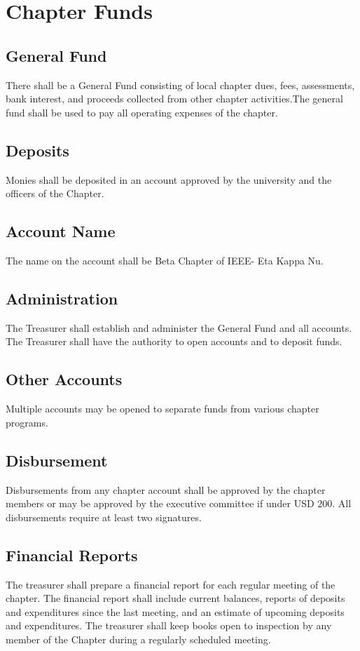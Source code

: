 \documentclass[10pt, oneside]{article}
\begin{document}
\section{Chapter Funds}
\subsection{General Fund}
There shall be a General Fund consisting of local chapter dues, fees, assessments, bank interest, and proceeds collected from other chapter activities.The general fund shall be used to pay all operating expenses of the chapter.
\subsection{Deposits}
Monies shall be deposited in an account approved by the university and the officers of the Chapter.
\subsection{Account Name}
The name on the account shall be Beta Chapter of IEEE- Eta Kappa Nu.
\subsection{Administration}
The Treasurer shall establish and administer the General Fund and all accounts. The Treasurer shall have the authority to open accounts and to deposit funds.
\subsection{Other Accounts}
Multiple accounts may be opened to separate funds from various chapter programs.
\subsection{Disbursement}
Disbursements from any chapter account shall be approved by the chapter members or may be approved by the executive committee if under USD 200. All disbursements require at least two signatures.
\subsection{Financial Reports}
The treasurer shall prepare a financial report for each regular meeting of the chapter. The financial report shall include current balances, reports of deposits and expenditures since the last meeting, and an estimate of upcoming deposits and expenditures. The treasurer shall keep books open to inspection by any member of the Chapter during a regularly scheduled meeting.
\end{document}
